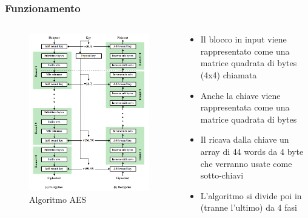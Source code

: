 		\begin{frame}
			\frametitle{Funzionamento}
			\begin{columns}
				\begin{column}{0.45\textwidth}
					\begin{center}
						\begin{figure}
							\includegraphics[width=\columnwidth]{img/aes}
							\caption{Algoritmo AES}
						\end{figure}
					\end{center}
				\end{column}
				\begin{column}{0.6\textwidth}
					\begin{itemize}
						\item Il blocco in input viene rappresentato come una matrice quadrata di bytes (4x4) chiamata 
						\item Anche la chiave viene rappresentata come una matrice quadrata di bytes
						\item Il  ricava dalla chiave un array di 44 words da 4 byte che verranno usate come sotto-chiavi
						\item L'algoritmo si divide poi in  (tranne l'ultimo) da 4 fasi
					\end{itemize}
				\end{column}
			\end{columns}
		\end{frame}
	
